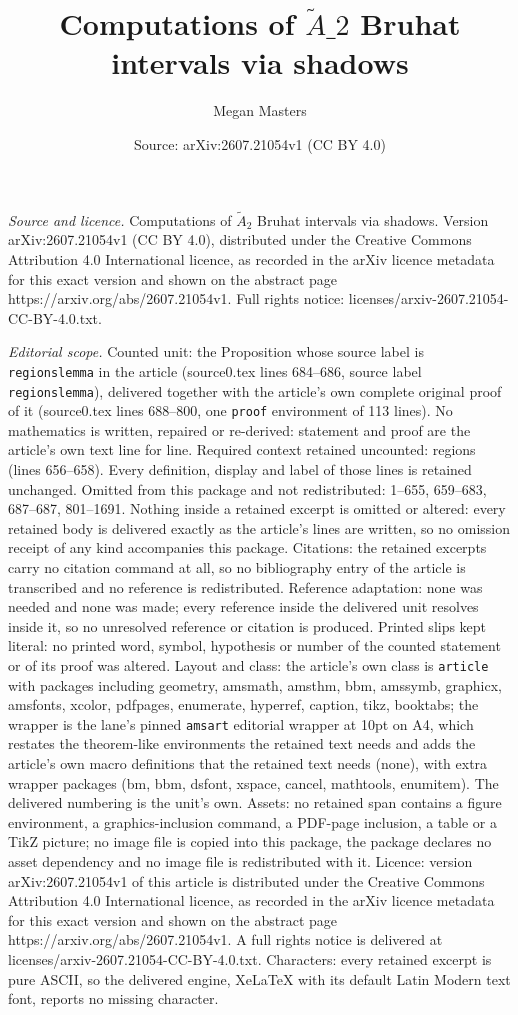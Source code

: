 \documentclass[10pt,a4paper]{amsart}
\title[Computations of $\tilde{A}\_2$ Bruhat intervals via shadows]{Computations of $\tilde{A}\_2$ Bruhat intervals via shadows}
\author{Megan Masters}
\date{Source: arXiv:2607.21054v1 (CC BY 4.0)}
\begin{document}
\maketitle

\noindent\emph{Source and licence.} Computations of $\tilde{A}_2$ Bruhat intervals via shadows. Version arXiv:2607.21054v1 (CC BY 4.0), distributed under the Creative Commons Attribution 4.0 International licence, as recorded in the arXiv licence metadata for this exact version and shown on the abstract page https://arxiv.org/abs/2607.21054v1. Full rights notice: licenses/arxiv-2607.21054-CC-BY-4.0.txt.\par\smallskip

\noindent\textit{Editorial scope.} Counted unit: the Proposition whose source label is \texttt{regionslemma} in the article (source0.tex lines 684--686, source label \texttt{regionslemma}), delivered together with the article's own complete original proof of it (source0.tex lines 688--800, one \texttt{proof} environment of 113 lines). No mathematics is written, repaired or re-derived: statement and proof are the article's own text line for line. Required context retained uncounted: regions (lines 656--658). Every definition, display and label of those lines is retained unchanged. Omitted from this package and not redistributed: 1--655, 659--683, 687--687, 801--1691. Nothing inside a retained excerpt is omitted or altered: every retained body is delivered exactly as the article's lines are written, so no omission receipt of any kind accompanies this package. Citations: the retained excerpts carry no citation command at all, so no bibliography entry of the article is transcribed and no reference is redistributed. Reference adaptation: none was needed and none was made; every reference inside the delivered unit resolves inside it, so no unresolved reference or citation is produced. Printed slips kept literal: no printed word, symbol, hypothesis or number of the counted statement or of its proof was altered. Layout and class: the article's own class is \texttt{article} with packages including geometry, amsmath, amsthm, bbm, amssymb, graphicx, amsfonts, xcolor, pdfpages, enumerate, hyperref, caption, tikz, booktabs; the wrapper is the lane's pinned \texttt{amsart} editorial wrapper at 10pt on A4, which restates the theorem-like environments the retained text needs and adds the article's own macro definitions that the retained text needs (none), with extra wrapper packages (bm, bbm, dsfont, xspace, cancel, mathtools, enumitem). The delivered numbering is the unit's own. Assets: no retained span contains a figure environment, a graphics-inclusion command, a PDF-page inclusion, a table or a TikZ picture; no image file is copied into this package, the package declares no asset dependency and no image file is redistributed with it. Licence: version arXiv:2607.21054v1 of this article is distributed under the Creative Commons Attribution 4.0 International licence, as recorded in the arXiv licence metadata for this exact version and shown on the abstract page https://arxiv.org/abs/2607.21054v1. A full rights notice is delivered at licenses/arxiv-2607.21054-CC-BY-4.0.txt. Characters: every retained excerpt is pure ASCII, so the delivered engine, XeLaTeX with its default Latin Modern text font, reports no missing character.
\end{document}
